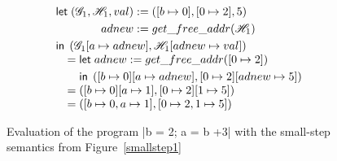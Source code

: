 \begin{figure}
\[\begin{array}{l}
\begin{aligned}[t]
      &\mathsf{let}\;
        \begin{aligned}[t]
          \left(\mathscr{G}_1, \mathscr{H}_1, val\right) &:= \left([b \mapsto 0], [0 \mapsto 2], 5\right) \\
          adnew &:= get\_free\_addr(\mathscr{H}_1) \\
        \end{aligned}\\
      &\mathsf{in}\; \left(\mathscr{G}_1[a \mapsto adnew], \mathscr{H}_1[adnew \mapsto val]\right) \\
    \end{aligned}\\
    \quad=
    \begin{aligned}[t]
      &\mathsf{let}\; adnew := get\_free\_addr([0 \mapsto 2]) \\
      &\mathsf{in}\; \left([b \mapsto 0][a \mapsto adnew], [0 \mapsto 2][adnew \mapsto 5]\right) \\
    \end{aligned}\\
    \quad= \left([b \mapsto 0][a \mapsto 1], [0 \mapsto 2][1 \mapsto 5]\right) \\
    \quad= \left([b \mapsto 0, a \mapsto 1], [0 \mapsto 2, 1 \mapsto 5]\right) \\
  \end{array}
\]
  \caption{Evaluation of the program \pycode|b = 2; a = b +3| with the small-step
    semantics from Figure~\ref{smallstep1}\label{evaluatingprog}}
\end{figure}

